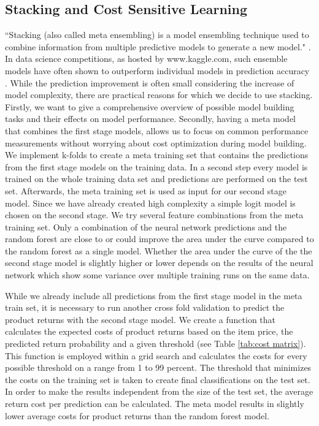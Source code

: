 \documentclass[12pt]{article}
\begin{document}
\subsection{Stacking and Cost Sensitive Learning}
``Stacking (also called meta ensembling) is a model ensembling technique used to combine information from multiple predictive models to generate a new model." \cite{WinNT5}. In data science competitions, as hosted by www.kaggle.com, such ensemble models have often shown to outperform individual models in prediction accuracy \cite{simidjievski2016modeling}. 
While the prediction improvement is often small considering the increase of model complexity, there are practical reasons for which we decide to use stacking. Firstly, we want to give a comprehensive overview of possible model building tasks and their effects on model performance. Secondly, having a meta model that combines the first stage models, allows us to focus on common performance measurements without worrying about cost optimization during model building. We implement k-folds to create a meta training set that contains the predictions from the first stage models on the training data. In a second step every model is trained on the whole training data set and predictions are performed on the test set. Afterwards, the meta training set is used as input for our second stage model. Since we have already created high complexity a simple logit model is chosen on the second stage. We try several feature combinations from the meta training set. Only a combination of the neural network predictions and the random forest are close to or could improve the area under the curve compared to the random forest as a single model. Whether the area under the curve of the the second stage model is slightly higher or lower depends on the results of the neural network which show some variance over multiple training runs on the same data.
 
While we already include all predictions from the first stage model in the meta train set, it is necessary to run another cross fold validation to predict the product returns with the second stage model. We create a function that calculates the expected costs of product returns based on the item price, the predicted return probability and a given threshold (see Table \ref{tab:cost matrix}). This function is employed within a grid search and calculates the costs for every possible threshold on a range from 1 to 99 percent. The threshold that minimizes the costs on the training set is taken to create final classifications on the test set. In order to make the results independent from the size of the test set, the average return cost per prediction can be calculated. The meta model results in slightly lower average costs for product returns than the random forest model. 
 
\end{document}
